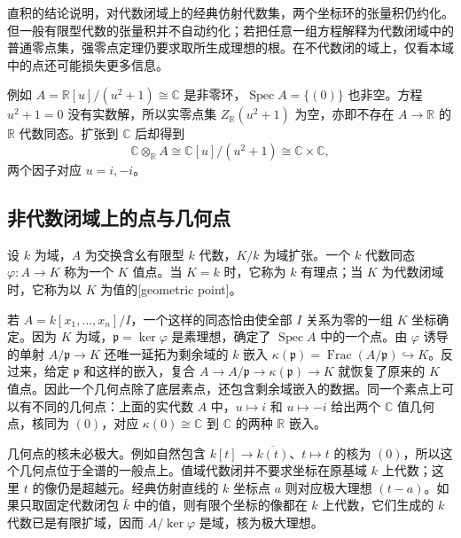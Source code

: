 直积的结论说明，对代数闭域上的经典仿射代数集，两个坐标环的张量积仍约化。但一般有限型代数的张量积并不自动约化；若把任意一组方程解释为代数闭域中的普通零点集，强零点定理仍要求取所生成理想的根。在不代数闭的域上，仅看本域中的点还可能损失更多信息。

\ProseParagraphBreak
例如 \(A=\mathbb R[u]/(u^2+1)\cong\mathbb C\) 是非零环，\(\operatorname{Spec}A=\{(0)\}\) 也非空。方程 \(u^2+1=0\) 没有实数解，所以实零点集 \(Z_{\mathbb R}(u^2+1)\) 为空，亦即不存在 \(A\to\mathbb R\) 的 \(\mathbb R\) 代数同态。扩张到 \(\mathbb C\) 后却得到
\[
	\mathbb C\otimes_{\mathbb R}A \cong\mathbb C[u]/(u^2+1)\cong\mathbb C\times\mathbb C,
\]
两个因子对应 \(u=i,-i\)。

\subsection{非代数闭域上的点与几何点}
\label{b3:subsec:0703:03}

\begin{definition}\label{b3:def:field-valued-point}
	设 \(k\) 为域，\(A\) 为交换含幺有限型 \(k\) 代数，\(K/k\) 为域扩张。一个 \(k\) 代数同态 \(\varphi:A\to K\) 称为一个 \(K\) 值点。当 \(K=k\) 时，它称为 \(k\) 有理点；当 \(K\) 为代数闭域时，它称为以 \(K\) 为值的[geometric point]。
\end{definition}

若 \(A=k[x_1,\ldots,x_n]/I\)，一个这样的同态恰由使全部 \(I\) 关系为零的一组 \(K\) 坐标确定。因为 \(K\) 为域，\(\mathfrak p=\ker\varphi\) 是素理想，确定了 \(\operatorname{Spec}A\) 中的一个点。由 \(\varphi\) 诱导的单射 \(A/\mathfrak p\to K\) 还唯一延拓为剩余域的 \(k\) 嵌入 \(\kappa(\mathfrak p)=\operatorname{Frac}(A/\mathfrak p)\hookrightarrow K\)。反过来，给定 \(\mathfrak p\) 和这样的嵌入，复合 \(A\to A/\mathfrak p\to\kappa(\mathfrak p)\to K\) 就恢复了原来的 \(K\) 值点。因此一个几何点除了底层素点，还包含剩余域嵌入的数据。同一个素点上可以有不同的几何点：上面的实代数 \(A\) 中，\(u\mapsto i\) 和 \(u\mapsto-i\) 给出两个 \(\mathbb C\) 值几何点，核同为 \((0)\)，对应 \(\kappa(0)\cong\mathbb C\) 到 \(\mathbb C\) 的两种 \(\mathbb R\) 嵌入。

几何点的核未必极大。例如自然包含 \(k[t]\to\overline{k(t)}\)、\(t\mapsto t\) 的核为 \((0)\)，所以这个几何点位于全谱的一般点上。值域代数闭并不要求坐标在原基域 \(k\) 上代数；这里 \(t\) 的像仍是超越元。经典仿射直线的 \(k\) 坐标点 \(a\) 则对应极大理想 \((t-a)\)。如果只取固定代数闭包 \(\bar k\) 中的值，则有限个坐标的像都在 \(k\) 上代数，它们生成的 \(k\) 代数已是有限扩域，因而 \(A/\ker\varphi\) 是域，核为极大理想。

